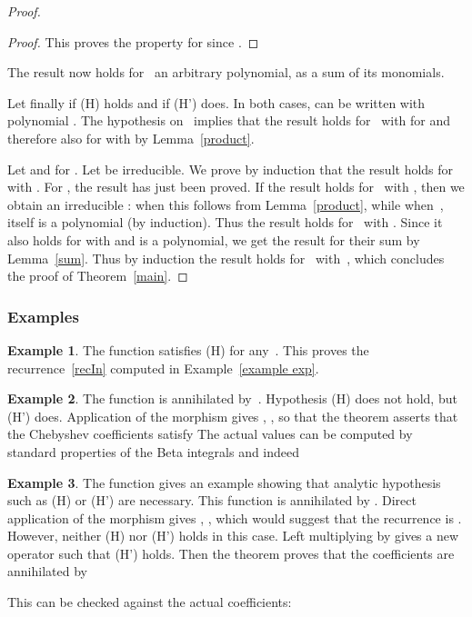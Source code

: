 \documentclass{amsart}
\theoremstyle{definition}
\newtheorem{example}{Example}
\begin{document}
\begin{proof}
\begin{proof}
This proves the property for  since . 
\end{proof}
The result now holds for~ an arbitrary polynomial, as a sum of its monomials.

Let finally  if (H) holds and  if (H') does. In both cases,  can be written
 with polynomial . The hypothesis on~ implies that the result holds for~ with  for  and therefore also for  with  by Lemma~\ref{product}.


Let  and  for . Let 
 be irreducible.
We prove by induction that the result holds for  with .
For , the result has just been proved.
If the result holds for~ with , then we obtain an irreducible : when  this follows from Lemma~\ref{product}, while when~,  itself is a polynomial (by induction). Thus the result holds for~ with . Since it also holds for  with  and  is a polynomial, we get the result for their sum by Lemma~\ref{sum}. Thus by induction the result holds for~ with~, which concludes the proof of Theorem~\ref{main}.
\end{proof}

\subsubsection{Examples}
\begin{example}
The function  satisfies (H) for any~. This proves the recurrence~\eqref{recIn} computed in Example~\ref{example exp}.
\end{example}
\begin{example}\label{ex-5}
The function  is annihilated by~. Hypothesis (H) does not hold, but (H') does. Application of the morphism gives , , so that the theorem asserts that the Chebyshev coefficients satisfy 
 The actual values can be computed by standard properties of the Beta integrals and indeed

\end{example}
\begin{example}\label{ex arccos} The function  gives an example showing that analytic hypothesis such as (H) or (H') are necessary. This function is annihilated by . Direct application of the morphism gives , , which would suggest that the recurrence is . However, neither (H) nor (H') holds in this case. Left multiplying  by  gives a new operator such that (H') holds. Then the theorem proves that the coefficients are annihilated by

This can be checked against the actual coefficients:

\end{example}
\end{document}
